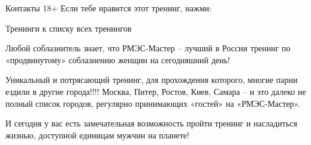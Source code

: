 Контакты
18+
Если тебе нравится этот тренинг, нажми:

Тренинги
к списку всех тренингов

Любой соблазнитель знает, что РМЭС-Мастер – лучший в России тренинг по «продвинутому» соблазнению женщин на сегодняшний день!

Уникальный и потрясающий тренинг, для прохождения которого, многие парни ездили в другие города!!!! Москва, Питер, Ростов, Киев, Самара – и это далеко не полный список городов, регулярно принимающих «гостей» на «РМЭС-Мастер».

И сегодня у вас есть замечательная возможность пройти тренинг и насладиться жизнью, доступной единицам мужчин на планете!


